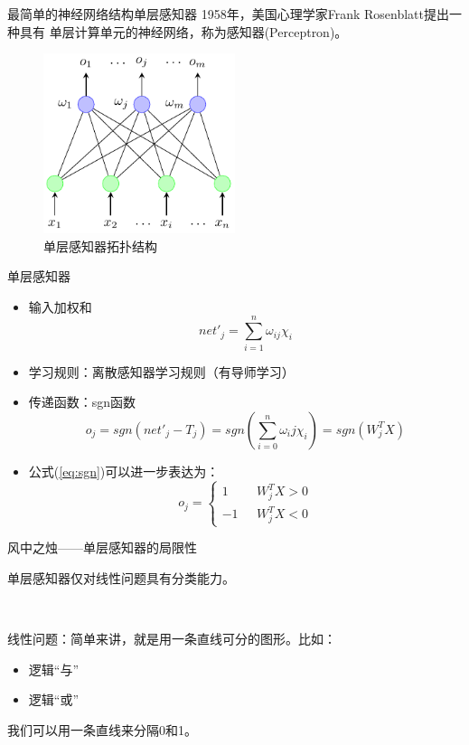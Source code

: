 \documentclass[xcolor=svgnames]{beamer}
\begin{document}
\begin{frame}{最简单的神经网络结构\pozhehao 单层感知器}
  1958年，美国心理学家Frank Rosenblatt提出一种具有%
  \alert{单层计算单元}的神经网络，称为\alert{感知器}(Perceptron)。
  \begin{figure}
    \centering
    \includegraphics[width=0.5\textwidth]{fig02.pdf}
    \vspace{-1em}
    \caption{单层感知器拓扑结构}
    \label{single}
  \end{figure}
\end{frame}

\begin{frame}{单层感知器}
  \begin{itemize}
  \item
    输入加权和
    \begin{equation} net'_j=\sum_{i=1}^n\omega_{ij}\chi_i \end{equation}
  \item 学习规则：离散感知器学习规则（有导师学习）
  \item 传递函数：sgn函数\\
    \begin{equation}
      \label{eq:sgn}
      o_j=sgn(net'_j-T_j)=sgn(\sum_{i=0}^n\omega_ij\chi_i)=sgn(W_j^TX)
    \end{equation}
  \item 公式(\ref{eq:sgn})可以进一步表达为：
    \begin{equation}
      o_j=\left \{ \begin{aligned} 1 & ~~~ W_j^TX>0 \\ -1 & ~~~ W_j^TX<0 \end{aligned} \right.
    \end{equation}
  \end{itemize}
\end{frame}

\begin{frame}{风中之烛——单层感知器的局限性}
  
  \alert{单层感知器仅对线性问题具有分类能力}。

  ~
  
  线性问题：简单来讲，就是用一条直线可分的图形。比如：
  \begin{itemize}
  \item 逻辑``与''
  \item 逻辑``或''
  \end{itemize}
  我们可以用一条直线来分隔0和1。
\end{frame}
\end{document}
